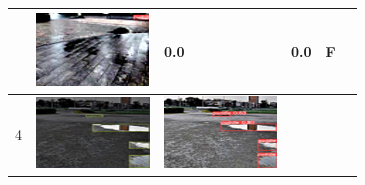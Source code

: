 \documentclass[10pt]{jarticle}
\begin{document}
\begin{table}[H]
\begin{tabular}{|l|l|l|l|l|l|}
\begin{minipage}{.1\textwidth}
           \end{minipage}       & \begin{minipage}{.1\textwidth}
            \centering
            \includegraphics[width=0.9\linewidth]{./fig/2tab3_r.png}
           \end{minipage}       & 0.0 & 0.0 & F      \\ \hline
        4  & \begin{minipage}{.1\textwidth}
            \centering
            \includegraphics[width=0.9\linewidth]{./fig/2tab4_a.png}
           \end{minipage}       & \begin{minipage}{.1\textwidth}
            \centering
            \includegraphics[width=0.9\linewidth]{./fig/2tab4_r.png}

\end{minipage}
\end{tabular}
\end{table}
\end{document}
